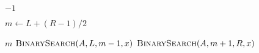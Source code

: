 
\begin{algorithm}[H]
  \begin{algorithmic}[1]
	\State \Return $-1$
      \EndIf

      \hStatex
      \State $m \gets L + (R - 1) / 2$

      \hStatex
	\State \Return $m$
	\State \Return $\Call{BinarySearch}{A, L, m-1, x}$
      \Else
	\State \Return $\Call{BinarySearch}{A, m+1, R, x}$
      \EndIf
    \EndProcedure
  \end{algorithmic}
\end{algorithm}
